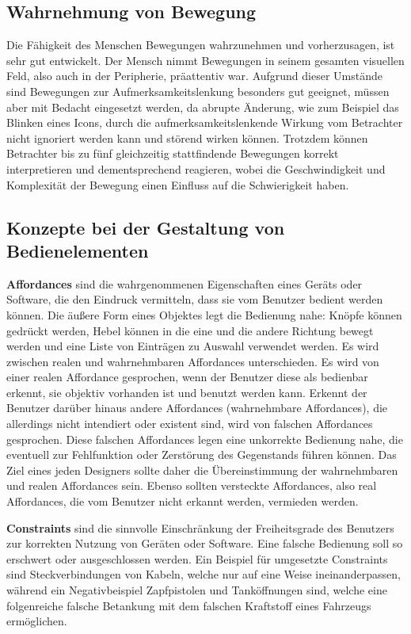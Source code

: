 \subsection{Wahrnehmung von Bewegung}

Die Fähigkeit des Menschen Bewegungen wahrzunehmen und vorherzusagen, ist sehr gut entwickelt. Der Mensch nimmt Bewegungen in seinem gesamten visuellen Feld, also auch in der Peripherie, präattentiv war. Aufgrund dieser Umstände sind Bewegungen zur Aufmerksamkeitslenkung besonders gut geeignet, müssen aber mit Bedacht eingesetzt werden, da abrupte Änderung, wie zum Beispiel das Blinken eines Icons, durch die aufmerksamkeitslenkende Wirkung vom Betrachter nicht ignoriert werden kann und störend wirken können. Trotzdem können Betrachter bis zu fünf gleichzeitig stattfindende Bewegungen korrekt interpretieren und dementsprechend reagieren, wobei die Geschwindigkeit und Komplexität der Bewegung einen Einfluss auf die Schwierigkeit haben. \cite[S. 60 f.]{2010.Preim}

\subsection{Konzepte bei der Gestaltung von Bedienelementen}
\textbf{Affordances} sind die wahrgenommenen Eigenschaften eines Geräts oder Software, die den Eindruck vermitteln, dass sie vom Benutzer bedient werden können. Die äußere Form eines Objektes legt die Bedienung nahe: Knöpfe können gedrückt werden, Hebel können in die eine und die andere Richtung bewegt werden und eine Liste von Einträgen zu Auswahl verwendet werden. Es wird zwischen realen und wahrnehmbaren Affordances unterschieden. Es wird von einer realen Affordance gesprochen, wenn der Benutzer diese als bedienbar erkennt, sie objektiv vorhanden ist und benutzt werden kann. Erkennt der Benutzer darüber hinaus andere Affordances (wahrnehmbare Affordances), die allerdings nicht intendiert oder existent sind, wird von falschen Affordances gesprochen. Diese falschen Affordances legen eine unkorrekte Bedienung nahe, die eventuell zur Fehlfunktion oder Zerstörung des Gegenstands führen können. Das Ziel eines jeden Designers sollte daher die Übereinstimmung der wahrnehmbaren und realen Affordances sein. Ebenso sollten versteckte Affordances, also real Affordances, die vom Benutzer nicht erkannt werden, vermieden werden. \cite[S. 136 ff.]{2010.Preim}

\textbf{Constraints} sind die sinnvolle Einschränkung der Freiheitsgrade des Benutzers zur korrekten Nutzung von Geräten oder Software. Eine falsche Bedienung soll so erschwert oder ausgeschlossen werden. Ein Beispiel für umgesetzte Constraints sind Steckverbindungen von Kabeln, welche nur auf eine Weise ineinanderpassen, während ein Negativbeispiel Zapfpistolen und Tanköffnungen sind, welche eine folgenreiche falsche Betankung mit dem falschen Kraftstoff eines Fahrzeugs ermöglichen. \cite[S. 136 ff.]{2010.Preim}

